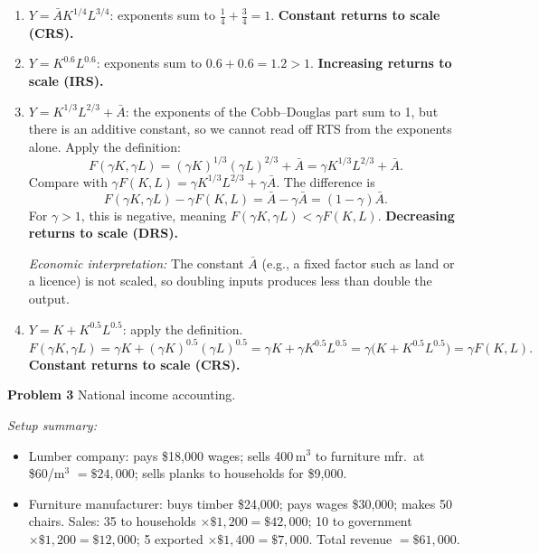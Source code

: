 \documentclass[12pt]{article}
\newenvironment{soln}{%
  \begin{tcolorbox}[
    breakable,
    colback=blue!4!white,
    colframe=blue!50!black,
    title={\textbf{Solution}},
    fonttitle=\small,
    left=4pt, right=4pt, top=4pt, bottom=4pt
  ]
}{%
  \end{tcolorbox}
}
\begin{document}
\begin{soln}
\begin{enumerate}[label=(\alph*),leftmargin=2em,itemsep=8pt]
  \item $Y = \bar{A}K^{1/4}L^{3/4}$: exponents sum to $\tfrac{1}{4}+\tfrac{3}{4}=1$.
        \textbf{Constant returns to scale (CRS).}

  \item $Y = K^{0.6}L^{0.6}$: exponents sum to $0.6+0.6=1.2>1$.
        \textbf{Increasing returns to scale (IRS).}

  \item $Y = K^{1/3}L^{2/3} + \bar{A}$: the exponents of the Cobb--Douglas part
        sum to 1, but there is an additive constant, so we cannot read off RTS
        from the exponents alone.  Apply the definition:
        \[
          F(\gamma K,\gamma L)
          = (\gamma K)^{1/3}(\gamma L)^{2/3} + \bar{A}
          = \gamma K^{1/3}L^{2/3} + \bar{A}.
        \]
        Compare with $\gamma F(K,L) = \gamma K^{1/3}L^{2/3} + \gamma\bar{A}$.
        The difference is
        \[
          F(\gamma K,\gamma L) - \gamma F(K,L)
          = \bar{A} - \gamma\bar{A} = (1-\gamma)\bar{A}.
        \]
        For $\gamma > 1$, this is negative, meaning $F(\gamma K,\gamma L) < \gamma F(K,L)$.
        \textbf{Decreasing returns to scale (DRS).}

        \textit{Economic interpretation:} The constant $\bar{A}$ (e.g., a fixed
        factor such as land or a licence) is not scaled, so doubling inputs
        produces less than double the output.

  \item $Y = K + K^{0.5}L^{0.5}$: apply the definition.
        \[
          F(\gamma K,\gamma L)
          = \gamma K + (\gamma K)^{0.5}(\gamma L)^{0.5}
          = \gamma K + \gamma K^{0.5}L^{0.5}
          = \gamma\bigl(K + K^{0.5}L^{0.5}\bigr)
          = \gamma F(K,L).
        \]
        \textbf{Constant returns to scale (CRS).}
\end{enumerate}
\end{soln}

\bigskip

\noindent\textbf{Problem 3} \quad National income accounting.

\bigskip
\textit{Setup summary:}
\begin{itemize}[leftmargin=1.5em,itemsep=2pt]
  \item Lumber company: pays \$18{,}000 wages; sells 400\,m$^3$ to furniture
        mfr.\ at \$60/m$^3$ $= \$24{,}000$; sells planks to households for
        \$9{,}000.
  \item Furniture manufacturer: buys timber \$24{,}000; pays wages \$30{,}000;
        makes 50 chairs.  Sales: 35 to households $\times \$1{,}200=\$42{,}000$;
        10 to government $\times \$1{,}200=\$12{,}000$;
        5 exported $\times \$1{,}400=\$7{,}000$.
        Total revenue $= \$61{,}000$.
\end{itemize}
\end{document}
